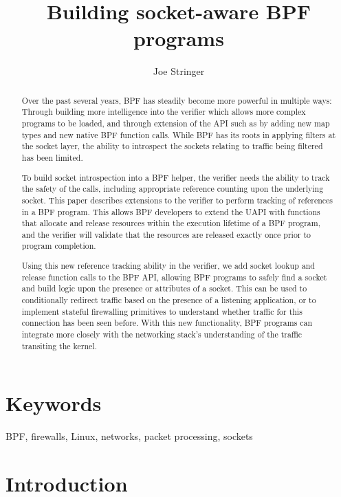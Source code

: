 \documentclass[10pt,sigconf,authorversion]{lpc}
\title{Building socket-aware BPF programs}
\author{Joe Stringer}
\affiliation{%
      \institution{Cilium.io}}
\begin{document}
\begin{abstract}

    Over the past several years, BPF has steadily become more powerful in
    multiple ways: Through building more intelligence into the verifier which
    allows more complex programs to be loaded, and through extension of the API
    such as by adding new map types and new native BPF function calls. While
    BPF has its roots in applying filters at the socket layer, the ability to
    introspect the sockets relating to traffic being filtered has been limited.

    To build socket introspection into a BPF helper, the verifier needs the
    ability to track the safety of the calls, including appropriate reference
    counting upon the underlying socket. This paper describes extensions to the
    verifier to perform tracking of references in a BPF program. This allows
    BPF developers to extend the UAPI with functions that allocate and release
    resources within the execution lifetime of a BPF program, and the verifier
    will validate that the resources are released exactly once prior to program
    completion.

    Using this new reference tracking ability in the verifier, we add socket
    lookup and release function calls to the BPF API, allowing BPF programs to
    safely find a socket and build logic upon the presence or attributes of a
    socket. This can be used to conditionally redirect traffic based on the
    presence of a listening application, or to implement stateful firewalling
    primitives to understand whether traffic for this connection has been seen
    before. With this new functionality, BPF programs can integrate more
    closely with the networking stack's understanding of the traffic transiting
    the kernel.

\end{abstract}

\maketitle

\section{Keywords}

BPF, firewalls, Linux, networks, packet processing, sockets

\section{Introduction}
\end{document}
